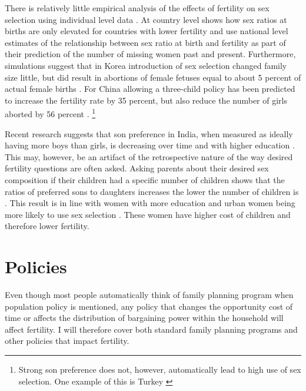 \documentclass[letterpaper,12pt]{article}
\begin{document}
There is relatively little empirical analysis of the effects of fertility 
on sex selection using individual level data \citep{park95,Ebenstein2011}.
At country level \citet{Bongaarts2013} shows how sex ratios at births are 
only elevated for countries with lower fertility and
\citet{Bongaarts2015} use national level estimates of the relationship
between sex ratio at birth and fertility as part of their
prediction of the number of missing women past and present.
Furthermore, simulations suggest that in Korea introduction of sex selection
changed family size little, but did result in abortions
of female fetuses equal to about 5 percent of actual female
births \citep{park95}.
For China allowing a three-child policy has been predicted to 
increase the fertility rate by 35 percent, but also reduce the
number of girls aborted by 56 percent \citep{Ebenstein2011}.%
\footnote{
Strong son preference does not, however, automatically lead to
high use of sex selection.
One example of this is Turkey \citep{Altindag2016}
}

Recent research suggests that son preference in India, when
measured as ideally having more boys than girls, is decreasing over time 
and with higher education \citep{bhat03,pande07}.
This may, however, be an artifact of the retrospective nature of
the way desired fertility questions are often asked.
Asking parents about their desired sex composition if their
children had a specific number of children shows that the
ratios of preferred sons to daughters increases the lower
the number of children is \citep{Jayachandran2017}.
This result is in line with women with more education and
urban women being more likely to use sex selection \citet{Portner2015b}.
These women have higher cost of children and therefore lower fertility.




\section{Policies}

Even though most people automatically think of family planning
program when population policy is mentioned, any policy that changes 
the opportunity cost of time or affects the distribution of
bargaining power within the household will affect fertility.
I will therefore cover both standard family planning programs
and other policies that impact fertility.
\end{document}
